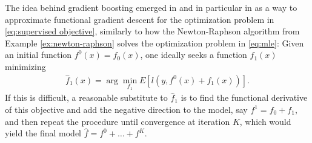 The idea behind gradient boosting emerged in \citet{friedman2001greedy} and in particular in \citet{mason1999boosting} as a way to approximate functional gradient descent for the optimization problem in \eqref{eq:supervised objective}, similarly to how the Newton-Raphson algorithm from Example \ref{ex:newton-raphson} solves the optimization problem in \eqref{eq:mle}:
Given an initial function $f^0(x)=f_0(x)$, one ideally seeks a function $f_1(x)$ minimizing
\begin{align}
	\hat{f}_1(x) = \arg\min_{f_1} E\left[ l\left(y,f^0(x)+f_1(x)\right) \right].
\end{align}
If this is difficult, a reasonable substitute to $\hat{f}_1$ is to find the functional derivative of this objective and add the negative direction to the model, say $f^1 = f_0 + f_1$, and then repeat the procedure until convergence at iteration $K$, which would yield the final model $\hat{f}=f^0+\dots+f^K$.

